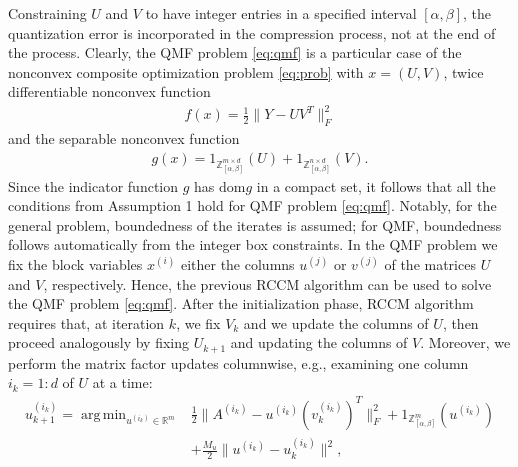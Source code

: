 \documentclass[lettersize,journal]{IEEEtran}
\DeclareMathOperator*{\argmin}{arg\,min}
\begin{document}
Constraining $U$ and $V$ to have integer entries in a specified interval $[\alpha,\beta]$, the quantization error is incorporated in the compression process, not at the end of the process. Clearly,  the QMF problem \eqref{eq:qmf}  is a particular case of the nonconvex composite optimization problem  \eqref{eq:prob} with
 $x=(U,V)$, twice differentiable nonconvex function  
\begin{align}
\label{eq:f}
f(x) =  \frac{1}{2} \| Y - UV^T\|_{F}^{2}
\end{align} 
and the separable  nonconvex function  
\begin{align}
\label{eq:g}
g(x) =  1_{ \mathbb{Z}_{[\alpha,\beta]}^{m \times d}} (U) + 1_{\mathbb{Z}_{[\alpha,\beta]}^{n \times d}}(V).
\end{align} 
Since the indicator function $g$ has $\text{dom} g$  in a compact set, it follows that all the conditions from Assumption 1 hold for QMF problem \eqref{eq:qmf}.  Notably, for the general problem, boundedness of the iterates is assumed; for QMF, boundedness follows automatically from the integer box constraints. In the QMF problem we fix the block variables $x^{(i)}$ either the columns  $u^{(j)}$ or $v^{(j)}$ of the matrices $U$ and $V$, respectively.   Hence, the previous RCCM algorithm  can be used to solve the QMF problem \eqref{eq:qmf}. 
After the initialization phase, RCCM algorithm requires that, at iteration $k$, we fix $V_k$ and we update the columns of  $U$, then proceed analogously by fixing $U_{k+1}$ and updating the columns of $V$. Moreover, we perform the matrix factor updates columnwise, e.g., examining one column $i_k=1:d$ of $U$
at a time:
\begin{align}
\label{eq:sub_prob_u}
u_{k+1}^{(i_k)}\! = \!\argmin_{u^{(i_k)} \in \mathbb{R}^{m}} \! &\frac{1}{2}\|A^{(i_k)} - \! u^{(i_k)} (v_k^{(i_k)})^T\|^2_F  + 1_{\mathbb{Z}_{[\alpha,\beta]}^{m}} (u^{(i_k)}) \nonumber\\
&+ \frac{M_u}{2} \| u^{(i_k)} -u_k^{(i_k)} \|^2,
\end{align}
\end{document}
